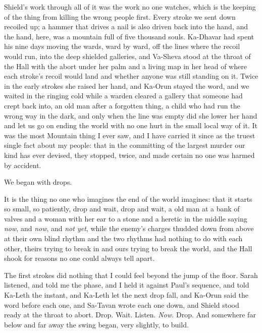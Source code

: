 Shield's work through all of it was the work no one watches, which is the keeping of the thing from killing the wrong people first. Every stroke we sent down recoiled up; a hammer that drives a nail is also driven back into the hand, and the hand, here, was a mountain full of five thousand souls. Ka-Dhavar had spent his nine days moving the wards, ward by ward, off the lines where the recoil would run, into the deep shielded galleries, and Va-Sheva stood at the throat of the Hall with the abort under her palm and a living map in her head of where each stroke's recoil would land and whether anyone was still standing on it. Twice in the early strokes she raised her hand, and Ka-Orun stayed the word, and we waited in the ringing cold while a warden cleared a gallery that someone had crept back into, an old man after a forgotten thing, a child who had run the wrong way in the dark, and only when the line was empty did she lower her hand and let us go on ending the world with no one hurt in the small local way of it. It was the most Mountain thing I ever saw, and I have carried it since as the truest single fact about my people: that in the committing of the largest murder our kind has ever devised, they stopped, twice, and made certain no one was harmed by accident.\par

\ornament

We began with drops.\par

It is the thing no one who imagines the end of the world imagines: that it starts so small, so patiently, drop and wait, drop and wait, a old man at a bank of valves and a woman with her ear to a stone and a heretic in the middle saying \emph{now}, and \emph{now}, and \emph{not yet}, while the enemy's charges thudded down from above at their own blind rhythm and the two rhythms had nothing to do with each other, theirs trying to break in and ours trying to break the world, and the Hall shook for reasons no one could always tell apart.\par

The first strokes did nothing that I could feel beyond the jump of the floor. Sarah listened, and told me the phase, and I held it against Paul's sequence, and told Ka-Leth the instant, and Ka-Leth let the next drop fall, and Ka-Orun said the word before each one, and Sa-Tavan wrote each one down, and Shield stood ready at the throat to abort. Drop. Wait. Listen. \emph{Now.} Drop. And somewhere far below and far away the swing began, very slightly, to build.\par

